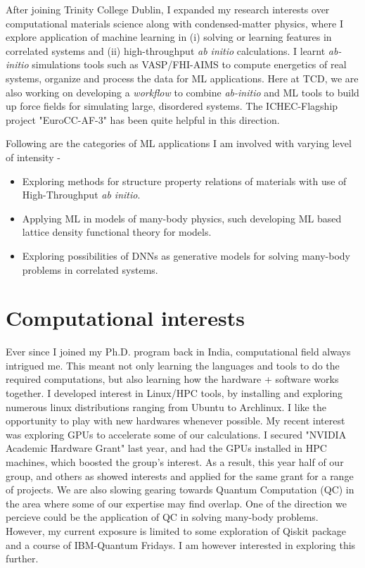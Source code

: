 \documentclass[10pt,a4paper,sans]{moderncv}        %
\begin{document}
{
  After joining Trinity College Dublin, I expanded my research interests over computational
  materials science along with condensed-matter physics, where I explore application of machine
  learning in (i) solving or learning features in correlated systems and (ii) high-throughput \textit{ab initio}
  calculations. I learnt \textit{ab-initio} simulations tools such as VASP/FHI-AIMS to compute energetics
  of real systems, organize and process the data for ML applications. Here at TCD, we are also
  working on developing a \textit{workflow} to combine \textit{ab-initio} and ML tools to build
  up force fields for simulating large, disordered systems. The ICHEC-Flagship project "EuroCC-AF-3"
  has been quite helpful in this direction.
  \vspace{0.5cm}
  
  Following are the categories of ML applications I am involved with varying level of intensity -
  \begin{itemize}
  \item Exploring methods for structure property relations of materials
    with use of High-Throughput \textit{ab initio}.
  \item Applying ML in models of many-body physics, such developing ML based lattice density functional theory for models.
  \item Exploring possibilities of DNNs as generative models for solving many-body problems in correlated systems.
  \end{itemize}
}
\vspace{0.5cm}

\section{Computational interests}

Ever since I joined my Ph.D. program back in India, computational field always intrigued me.
This meant not only learning the languages and tools to do the required computations, but
also learning how the hardware + software works together. I developed interest in Linux/HPC
tools, by installing and exploring numerous linux distributions ranging from Ubuntu to Archlinux.
I like the opportunity to play with new hardwares whenever possible.
\vspace{0.3cm}
My recent interest was exploring GPUs to accelerate some of our calculations. I secured
"NVIDIA Academic Hardware Grant" last year, and had the GPUs installed in HPC machines,
which boosted the group's interest. As a result, this year half of our group, and others as showed
interests and applied for the same grant for a range of projects.
\vspace{0.3cm}
We are also slowing gearing towards Quantum Computation (QC) in the area where some of our expertise may find
overlap. One of the direction we percieve could be the application of QC in solving many-body problems. However,
my current exposure is limited to some exploration of Qiskit package and a course of IBM-Quantum Fridays.
I am however interested in exploring this further.
\end{document}
